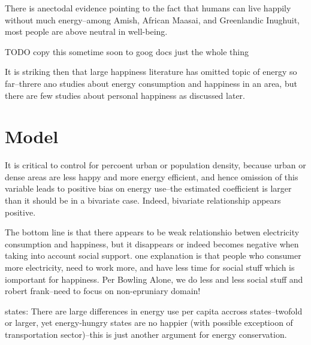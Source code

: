 \documentclass[10pt, letterpaper]{article}
\begin{document}
\begin{spacing}{1.4}
There is anectodal evidence pointing to the fact that humans can live happily
without much energy--among Amish, African Maasai, and Greenlandic Inughuit, most
people are above neutral in well-being.

TODO copy this sometime soon to goog docs just the whole thing

It is striking then that large happiness literature has omitted topic of energy
so far--threre ano studies about energy consumption and happiness in an area,
but there are few studies about personal happiness as discussed later.

\section{Model}

It is critical to control for percoent urban or population density, because
urban or dense areas are less happy and more energy efficient, and hence
omission of this variable leads to positive bias on energy use--the estimated
coefficient   is larger than it should be in a bivariate case. Indeed, bivariate
relationship appears positive. 

The bottom line is that there appears to be weak relationshio betwen electricity
consumption and happiness, but it disappears or indeed becomes negative when
taking into account social support. one explanation is that people who consumer
more electricity, need to work more, and have less time for social stuff which
is iomportant for happiness. Per Bowling Alone, we do less and less social stuff
and robert frank--need to focus on non-epruniary domain!







states:
There are large differences in energy use per capita accross states--twofold or
larger, yet energy-hungry states are no happier (with possible exceptioon of
transportation sector)--this is just another argument for energy conservation.

\newpage


\end{spacing}
\end{document}
